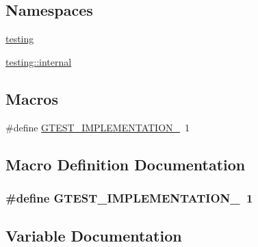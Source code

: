 \subsection*{Namespaces}
\begin{DoxyCompactItemize}
\item 
 \hyperlink{namespacetesting}{testing}
\item 
 \hyperlink{namespacetesting_1_1internal}{testing\+::internal}
\end{DoxyCompactItemize}
\subsection*{Macros}
\begin{DoxyCompactItemize}
\item 
\#define \hyperlink{gtest-filepath__test_8cc_a83bd232fd1077579fada92c31bb7469f}{G\+T\+E\+S\+T\+\_\+\+I\+M\+P\+L\+E\+M\+E\+N\+T\+A\+T\+I\+O\+N\+\_\+}~1
\end{DoxyCompactItemize}


\subsection{Macro Definition Documentation}
\subsubsection[{\texorpdfstring{G\+T\+E\+S\+T\+\_\+\+I\+M\+P\+L\+E\+M\+E\+N\+T\+A\+T\+I\+O\+N\+\_\+}{GTEST_IMPLEMENTATION_}}]{\setlength{\rightskip}{0pt plus 5cm}\#define G\+T\+E\+S\+T\+\_\+\+I\+M\+P\+L\+E\+M\+E\+N\+T\+A\+T\+I\+O\+N\+\_\+~1}\hypertarget{gtest-filepath__test_8cc_a83bd232fd1077579fada92c31bb7469f}{}\label{gtest-filepath__test_8cc_a83bd232fd1077579fada92c31bb7469f}


\subsection{Variable Documentation}
